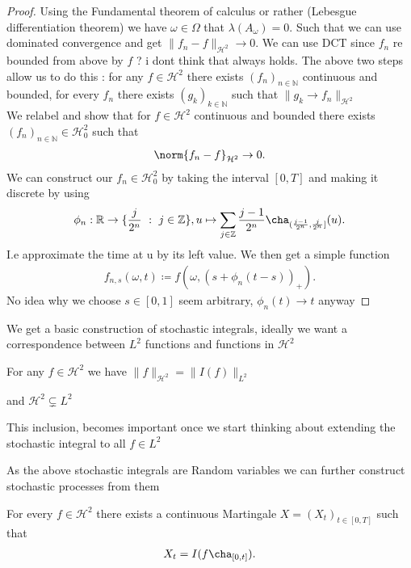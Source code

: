 \begin{proof}
  Using the Fundamental theorem of calculus or rather (Lebesgue differentiation theorem) we have $\omega  \in  \Omega  $ that $\lambda(A_\omega ) = 0$.
  Such that we can use dominated convergence and get $\|f_n - f\|_{\mathcal{H}^2} \to  0$. We can use DCT since $f_n$ re bounded from above by $f$ ? i dont think that always holds.
  The above two steps allow us to do this : for any $f \in  \mathcal{H}^2$ there exists $(f_n)_{n \in  \mathbb{N}}$ continuous and bounded,
  for every $f_n$ there exists $(g_k)_{k \in  \mathbb{N}}$ such that $\|g_k \to  f_n\|_{\mathcal{H}^2}$ \\[1ex]
  We relabel and show that for $f \in  \mathcal{H}^2$ continuous and bounded there exists $(f_n)_{n \in  \mathbb{N}} \in  \mathcal{H}^2_0$ such that 
  \begin{align*}
    \norm{f_n -f}_{\mathcal{H}^2} \to  0
  .\end{align*}
  We can construct our $f_n \in  \mathcal{H}^2_0$ by taking the interval $[0,T]$ and making it discrete by using 
  \begin{align*}
    \phi_n : \mathbb{R} \to  \{\frac{j}{2^{n} } \ : \ j \in  \mathbb{Z}\}   , u \mapsto \sum_{j \in  \mathbb{Z}} \frac{j-1}{2^{n} } \cha_{(\frac{j-1}{2^{n} },\frac{j}{2^n}]}(u)
  .\end{align*}
  I.e approximate the time at u by its left value. We then get a simple function 
  \begin{align*}
    f_{n,s}(\omega ,t) \coloneqq  f(\omega ,(s+\phi_n(t-s))_+)
  .\end{align*}
  No idea why we choose $s \in  [0,1]$ seem arbitrary, $\phi_n(t) \to t$ anyway
\end{proof}
We get a basic construction of stochastic integrals, ideally we want a correspondence between $L^2$ functions and functions in $\mathcal{H}^2$
\begin{definition}
  For any $f \in  \mathcal{H}^2$  we have $\|f\|_{\mathcal{H}^2} = \|I(f)\|_{L^2}$
\end{definition}
and $\mathcal{H}^2 \subsetneq L^2$
\begin{remark}
 This inclusion, becomes important once we start thinking about extending the stochastic integral to all $f \in L^2$
\end{remark}
As the above stochastic integrals are Random variables we can further construct stochastic processes from them 
\begin{definition}
  For every $f \in  \mathcal{H}^2$  there exists a continuous Martingale $X = (X_t)_{t \in  [0,T]}$ such that 
  \begin{align*}
    X_t = I(f\cha_{[0,t]})
  .\end{align*}
\end{definition}
